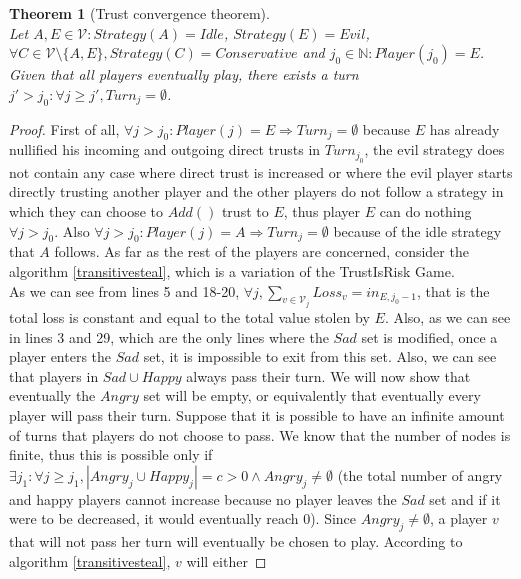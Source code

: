 \documentclass[11pt]{article}
\newtheorem{theorem}{Theorem}[section]
\theoremstyle{definition}
\theoremstyle{corollary}
\theoremstyle{lemma}
\begin{document}
    \begin{theorem}[Trust convergence theorem] \ \\
    \label{convergence}
       Let $A,E \in \mathcal{V} : Strategy(A) = Idle$, $Strategy(E) = Evil$, $\forall C \in \mathcal{V} \setminus \{A,E\},
       Strategy(C) = Conservative$ and $j_0 \in \mathbb{N} : Player(j_0) = E$. Given that all players eventually play, there
       exists a turn $j' > j_0 : \forall j \geq j', Turn_j = \emptyset$.
    \end{theorem}
    \begin{proof}
       First of all, $\forall j > j_0 : Player(j) = E \Rightarrow Turn_j = \emptyset$ because $E$ has already nullified his
       incoming and outgoing direct trusts in $Turn_{j_0}$, the evil strategy does not contain any case where direct trust is
       increased or where the evil player starts directly trusting another player and the other players do not follow a
       strategy in which they can choose to $Add()$ trust to $E$, thus player $E$ can do nothing $\forall j > j_0$. Also
       $\forall j > j_0 : Player(j) = A \Rightarrow Turn_j = \emptyset$ because of the idle strategy that $A$ follows. As far
       as the rest of the players are concerned, consider the algorithm \ref{transitivesteal}, which is a variation of the
       TrustIsRisk Game. \\
       As we can see from lines 5 and 18-20, $\forall j, \sum\limits_{v \in \mathcal{V}_j}Loss_v = in_{E, j_0-1}$, that is
       the total loss is constant and equal to the total value stolen by $E$. Also, as we can see in lines 3 and 29, which
       are the only lines where the $Sad$ set is modified, once a player enters the $Sad$ set, it is impossible to exit from
       this set. Also, we can see that players in $Sad \cup Happy$ always pass their turn. We will now show that eventually
       the $Angry$ set will be empty, or equivalently that eventually every player will pass their turn. Suppose that it is
       possible to have an infinite amount of turns that players do not choose to pass. We know that the number of nodes is
       finite, thus this is possible only if $\exists j_1: \forall j \geq j_1, |Angry_j \cup Happy_j| = c > 0 \wedge Angry_j
       \neq \emptyset$ (the total number of angry and happy players cannot increase because no player leaves the $Sad$ set
       and if it were to be decreased, it would eventually reach 0). Since $Angry_j \neq \emptyset$, a player $v$ that will
       not pass her turn will eventually be chosen to play. According to algorithm \ref{transitivesteal}, $v$ will either

\end{proof}
\end{document}

